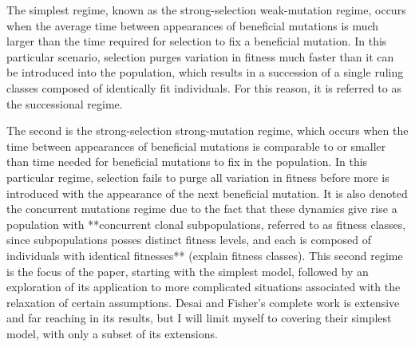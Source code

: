 \documentclass[12pt]{article}
\begin{document}


 
The simplest regime, known as the strong-selection weak-mutation regime, occurs when the average time between appearances of beneficial mutations is much larger than the time required for selection to fix a beneficial mutation.  In this particular scenario, selection purges variation in fitness much faster than it can be introduced into the population, which results in a succession of a single ruling classes composed of identically fit individuals.  For this reason, it is referred to as the successional regime.  

The second is the strong-selection strong-mutation regime, which occurs when the time between appearances of beneficial mutations is comparable to or smaller than time needed for beneficial mutations to fix in the population.  In this particular regime, selection fails to purge all variation in fitness before more is introduced with the appearance of the next beneficial mutation.  It is also denoted the concurrent mutations regime due to the fact that these dynamics give rise a population with **concurrent clonal subpopulations, referred to as fitness classes, since subpopulations posses distinct fitness levels, and each is composed of individuals with identical fitnesses** (explain fitness classes).  This second regime is the focus of the paper, starting with the simplest model, followed by an exploration of its application to more complicated situations associated with the relaxation of certain assumptions.  Desai and Fisher's complete work is extensive and far reaching in its results, but I will limit myself to covering their simplest model, with only a subset of its extensions. 
\end{document}
